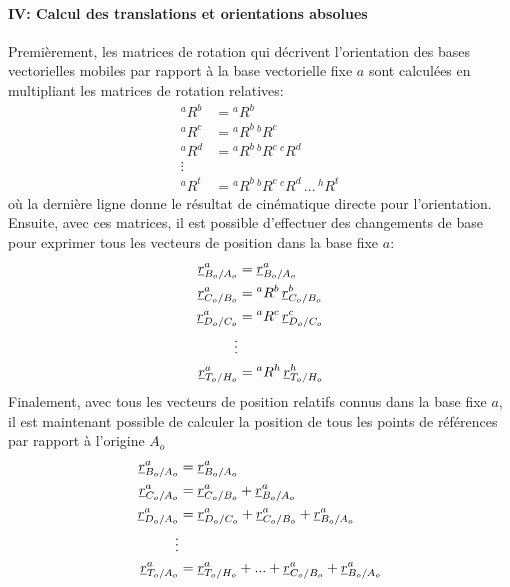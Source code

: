 \paragraph{IV: Calcul des translations et orientations absolues}


Premièrement, les matrices de rotation qui décrivent l'orientation des bases vectorielles mobiles par rapport à la base vectorielle fixe $a$ sont calculées en multipliant les matrices de rotation relatives:
\begin{align}
{}^aR^b &= {}^aR^b \\
{}^aR^c &= {}^aR^b \, {}^bR^c \\
{}^aR^d &= {}^aR^b \, {}^bR^c \, {}^cR^d \\
\vdots  & \nonumber \\
{}^aR^t &= {}^aR^b \, {}^bR^c \, {}^cR^d   \, ...  \, {}^hR^t
\end{align} 
où la dernière ligne donne le résultat de cinématique directe pour l'orientation. Ensuite, avec ces matrices, il est possible d'effectuer des changements de base pour exprimer tous les vecteurs de position dans la base fixe $a$: 
\begin{align}
\underline{r}_{B_o/A_o}^a &= \underline{r}_{B_o/A_o}^a \\
\underline{r}_{C_o/B_o}^a &= {}^aR^b \, \underline{r}_{C_o/B_o}^b \\
\underline{r}_{D_o/C_o}^a &= {}^aR^c \, \underline{r}_{D_o/C_o}^c \\
\vdots  & \nonumber \\
\underline{r}_{T_o/H_o}^a &= {}^aR^h \, \underline{r}_{T_o/H_o}^h 
\end{align} 
Finalement, avec tous les vecteurs de position relatifs connus dans la base fixe $a$, il est maintenant possible de calculer la position de tous les points de références par rapport à l'origine $A_o$
\begin{align}
\underline{r}_{B_o/A_o}^a &= \underline{r}_{B_o/A_o}^a \\
\underline{r}_{C_o/A_o}^a &= \underline{r}_{C_o/B_o}^a + \underline{r}_{B_o/A_o}^a \\
\underline{r}_{D_o/A_o}^a &= \underline{r}_{D_o/C_o}^a + \underline{r}_{C_o/B_o}^a + \underline{r}_{B_o/A_o}^a \\
\vdots  & \nonumber \\
\underline{r}_{T_o/A_o}^a &= \underline{r}_{T_o/H_o}^a +  ... + \underline{r}_{C_o/B_o}^a + \underline{r}_{B_o/A_o}^a
\end{align} 
